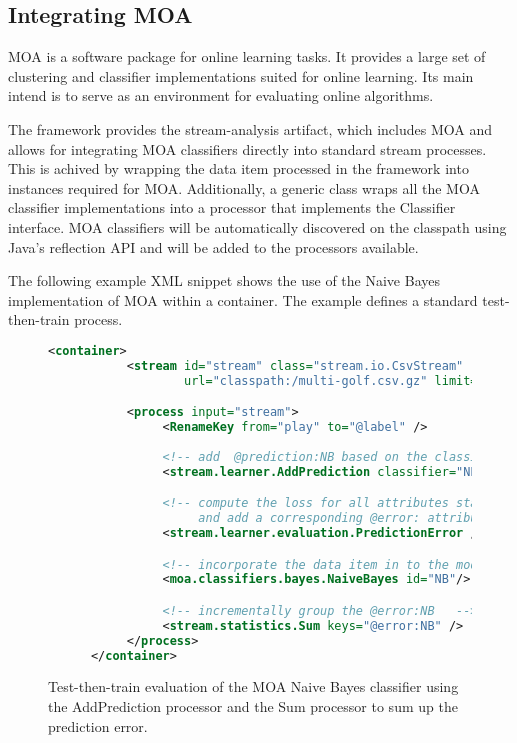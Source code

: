 \subsection{\label{sec:moa}Integrating MOA}

MOA is a software package for online learning tasks. It provides a
large set of clustering and classifier implementations suited for
online learning. Its main intend is to serve as an environment for
evaluating online algorithms.

The \streams framework provides the {\ttfamily stream-analysis}
artifact, which includes MOA and allows for integrating MOA
classifiers directly into standard stream processes. This is achived
by wrapping the data item processed in the \streams framework into
instances required for MOA. Additionally, a generic class wraps all
the MOA classifier implementations into a processor that implements
the {\ttfamily Classifier} interface. MOA classifiers will be
automatically discovered on the classpath using Java's reflection API
and will be added to the processors available.

The following example XML snippet shows the use of the Naive Bayes
implementation of MOA within a \streams container. The example defines
a standard test-then-train process.


\begin{figure}[h!]
  \centering
  \begin{lstlisting}[language=XML]
      <container>
           <stream id="stream" class="stream.io.CsvStream"
                   url="classpath:/multi-golf.csv.gz" limit="100"/>

           <process input="stream">
                <RenameKey from="play" to="@label" />
        
                <!-- add  @prediction:NB based on the classifier "NB"  -->
                <stream.learner.AddPrediction classifier="NB" />

                <!-- compute the loss for all attributes starting with @prediction:
                     and add a corresponding @error: attribute with the loss   -->
                <stream.learner.evaluation.PredictionError />

                <!-- incorporate the data item in to the model (learning)  -->
                <moa.classifiers.bayes.NaiveBayes id="NB"/>

                <!-- incrementally group the @error:NB   -->
                <stream.statistics.Sum keys="@error:NB" />
           </process>
      </container>
  \end{lstlisting}
  \caption{\label{fig:testThenTraing}Test-then-train evaluation of the
    MOA Naive Bayes classifier using the {\ttfamily AddPrediction}
    processor and the {\ttfamily Sum} processor to sum up the
    prediction error.}
\end{figure}

